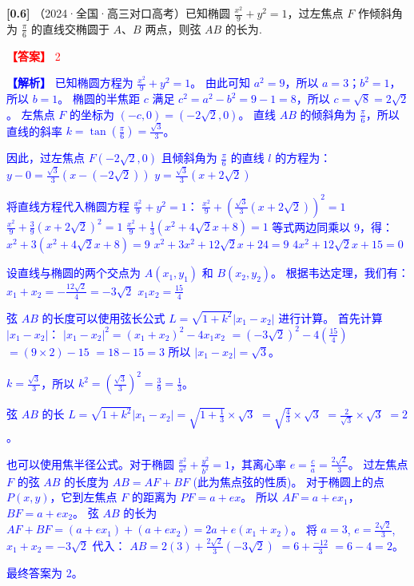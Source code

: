 \documentclass[varwidth=16cm, border=2mm]{standalone}
\begin{document}
\textbf{[0.6]} （2024·全国·高三对口高考）已知椭圆 $\frac{x^2}{9} + y^2 = 1$，过左焦点 $F$ 作倾斜角为 $\frac{\pi}{6}$ 的直线交椭圆于 $A$、$B$ 两点，则弦 $AB$ 的长为\underline{\hspace{1.5cm}}.

\vspace{0.2cm}\par\noindent\textcolor{red}{\textbf{【答案】} 2}
\par\noindent\textcolor{blue}{\textbf{【解析】} 已知椭圆方程为 $\frac{x^2}{9} + y^2 = 1$。
由此可知 $a^2 = 9$，所以 $a = 3$；$b^2 = 1$，所以 $b = 1$。
椭圆的半焦距 $c$ 满足 $c^2 = a^2 - b^2 = 9 - 1 = 8$，所以 $c = \sqrt{8} = 2\sqrt{2}$。
左焦点 $F$ 的坐标为 $(-c, 0) = (-2\sqrt{2}, 0)$。
直线 $AB$ 的倾斜角为 $\frac{\pi}{6}$，所以直线的斜率 $k = \tan(\frac{\pi}{6}) = \frac{\sqrt{3}}{3}$。

因此，过左焦点 $F(-2\sqrt{2}, 0)$ 且倾斜角为 $\frac{\pi}{6}$ 的直线 $l$ 的方程为：
$y - 0 = \frac{\sqrt{3}}{3}(x - (-2\sqrt{2}))$
$y = \frac{\sqrt{3}}{3}(x + 2\sqrt{2})$

将直线方程代入椭圆方程 $\frac{x^2}{9} + y^2 = 1$：
$\frac{x^2}{9} + (\frac{\sqrt{3}}{3}(x + 2\sqrt{2}))^2 = 1$
$\frac{x^2}{9} + \frac{3}{9}(x + 2\sqrt{2})^2 = 1$
$\frac{x^2}{9} + \frac{1}{3}(x^2 + 4\sqrt{2}x + 8) = 1$
等式两边同乘以 9，得：
$x^2 + 3(x^2 + 4\sqrt{2}x + 8) = 9$
$x^2 + 3x^2 + 12\sqrt{2}x + 24 = 9$
$4x^2 + 12\sqrt{2}x + 15 = 0$

设直线与椭圆的两个交点为 $A(x_1, y_1)$ 和 $B(x_2, y_2)$。
根据韦达定理，我们有：
$x_1 + x_2 = -\frac{12\sqrt{2}}{4} = -3\sqrt{2}$
$x_1 x_2 = \frac{15}{4}$

弦 $AB$ 的长度可以使用弦长公式 $L = \sqrt{1+k^2}|x_1-x_2|$ 进行计算。
首先计算 $|x_1-x_2|$：
$|x_1-x_2|^2 = (x_1+x_2)^2 - 4x_1x_2$
$= (-3\sqrt{2})^2 - 4(\frac{15}{4})$
$= (9 \times 2) - 15$
$= 18 - 15 = 3$
所以 $|x_1-x_2| = \sqrt{3}$。

$k = \frac{\sqrt{3}}{3}$，所以 $k^2 = (\frac{\sqrt{3}}{3})^2 = \frac{3}{9} = \frac{1}{3}$。

弦 $AB$ 的长 $L = \sqrt{1+k^2}|x_1-x_2| = \sqrt{1 + \frac{1}{3}} \times \sqrt{3}$
$= \sqrt{\frac{4}{3}} \times \sqrt{3}$
$= \frac{2}{\sqrt{3}} \times \sqrt{3}$
$= 2$。

也可以使用焦半径公式。对于椭圆 $\frac{x^2}{a^2} + \frac{y^2}{b^2} = 1$，其离心率 $e = \frac{c}{a} = \frac{2\sqrt{2}}{3}$。
过左焦点 $F$ 的弦 $AB$ 的长度为 $AB = AF + BF$ (此为焦点弦的性质)。
对于椭圆上的点 $P(x,y)$，它到左焦点 $F$ 的距离为 $PF = a + ex$。
所以 $AF = a + ex_1$，$BF = a + ex_2$。
弦 $AB$ 的长为 $AF + BF = (a + ex_1) + (a + ex_2) = 2a + e(x_1+x_2)$。
将 $a=3$, $e=\frac{2\sqrt{2}}{3}$, $x_1+x_2=-3\sqrt{2}$ 代入：
$AB = 2(3) + \frac{2\sqrt{2}}{3}(-3\sqrt{2})$
$= 6 + \frac{-12}{3}$
$= 6 - 4 = 2$。

最终答案为 2。}
\end{document}
